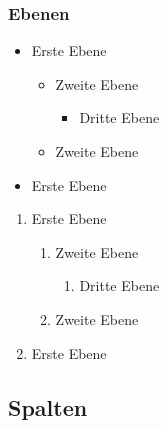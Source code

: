 \documentclass[t,aspectratio=169]{beamer}
\begin{document}
\begin{frame}
	\frametitle{Ebenen}
	\begin{itemize}
		\item Erste Ebene
			\begin{itemize}
				\item Zweite Ebene
				\begin{itemize}
					\item Dritte Ebene
				\end{itemize}
				\item Zweite Ebene
			\end{itemize}
		\item Erste Ebene
	\end{itemize}
	\begin{enumerate}	
		\item Erste Ebene
			\begin{enumerate}
				\item Zweite Ebene
				\begin{enumerate}
					\item Dritte Ebene
				\end{enumerate}
				\item Zweite Ebene
			\end{enumerate}
		\item Erste Ebene
	\end{enumerate}
\end{frame}

\subsection{Spalten} %
\end{document}
